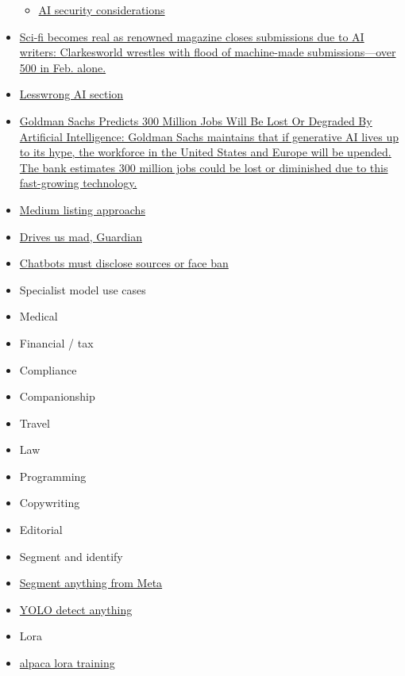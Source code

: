 \begin{itemize}
  \begin{itemize}
   
  \item
    \href{https://ico.org.uk/for-organisations/guide-to-data-protection/key-dp-themes/guidance-on-ai-and-data-protection/how-should-we-assess-security-and-data-minimisation-in-ai/}{AI
    security considerations}
  \end{itemize}
\item
  \href{https://arstechnica.com/information-technology/2023/02/sci-fi-becomes-real-as-renowned-magazine-closes-submissions-due-to-ai-writers/}{Sci-fi
  becomes real as renowned magazine closes submissions due to AI
  writers: Clarkesworld wrestles with flood of machine-made
  submissions---over 500 in Feb. alone.}
\item
  \href{https://www.lesswrong.com/tag/ai}{Lesswrong AI section}
\item
  \href{https://www.forbes.com/sites/jackkelly/2023/03/31/goldman-sachs-predicts-300-million-jobs-will-be-lost-or-degraded-by-artificial-intelligence/?sh=3af7314e782b}{Goldman
  Sachs Predicts 300 Million Jobs Will Be Lost Or Degraded By Artificial
  Intelligence: Goldman Sachs maintains that if generative AI lives up
  to its hype, the workforce in the United States and Europe will be
  upended. The bank estimates 300 million jobs could be lost or
  diminished due to this fast-growing technology.}
\item
  \href{https://blog.medium.com/how-were-approaching-ai-generated-writing-on-medium-16ee8cb3bc89}{Medium
  listing approachs}
\item
  \href{https://www.theguardian.com/technology/2023/mar/23/tech-guru-jaron-lanier-the-danger-isnt-that-ai-destroys-us-its-that-it-drives-us-insane}{Drives
  us mad, Guardian}
\item
  \href{https://www.artisana.ai/articles/eus-ai-act-stricter-rules-for-chatbots-on-the-horizon}{Chatbots
  must disclose sources or face ban}
\item
  Specialist model use cases
\item
  Medical
\item
  Financial / tax
\item
  Compliance
\item
  Companionship
\item
  Travel
\item
  Law
\item
  Programming
\item
  Copywriting
\item
  Editorial
\item
  Segment and identify
\item
  \href{https://segment-anything.com/}{Segment anything from Meta}
\item
  \href{https://deci.ai/blog/yolo-nas-foundation-model-object-detection/}{YOLO
  detect anything}
\item
  Lora
\item
  \href{https://discord.com/channels/1086739839761776660/1087508281758584852}{alpaca
  lora training}


\end{itemize}
